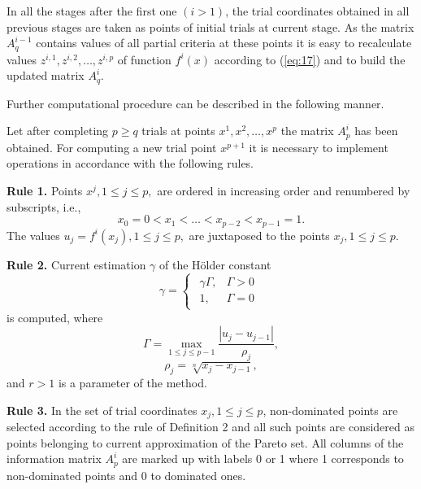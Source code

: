 \documentclass[runningheads]{llncs}
\begin{document}
In all the stages after the first one $(i>1)$, the trial coordinates obtained in all previous stages are taken as points of initial trials at current stage. As the matrix $A^{i-1}_q$ contains values of all partial criteria at these points it is easy to recalculate values $z^{i,1}, z^{i,2}, \dots, z^{i,p}$ of function $f^i(x)$ according to (\ref{eq:17}) and to build the updated matrix $A^i_q$.

Further computational procedure can be described in the following manner.

Let after completing $p \geq q$ trials at points $x^1, x^2, \dots, x^p$ the matrix $A^i_p$ has been obtained. For computing a new trial point $x^{p+1}$ it is necessary to implement operations in accordance with the following rules.

\textbf{Rule 1.} Points $x^j, 1 \leq j\leq p,$ are ordered in increasing order and renumbered by subscripts, i.e.,
\begin{equation}
    \label{eq:19}
    x_0 = 0 < x_1 < \dots < x_{p-2} < x_{p-1} = 1.
\end{equation}
The values $u_j = f^i(x_j), 1\leq j \leq p,$ are juxtaposed to the points $x_j, 1\leq j \leq p$.

\textbf{Rule 2.} Current estimation $\gamma$ of the H{\" o}lder constant  
\begin{equation}
    \label{eq:20}
\gamma=
\begin{cases}
  \begin{matrix}
     \gamma \Gamma, & \Gamma >0 \\
     1, & \Gamma = 0 
  \end{matrix}
\end{cases}
\end{equation}
is computed, where
\begin{equation}
    \label{eq:21}
\Gamma=
\max_{1 \leq j \leq p-1} {\frac{|u_j - u_{j-1}|}{\rho_j} },
\end{equation}
\begin{equation}
    \label{eq:22}
\rho_j = \sqrt[n]{x_j-x_{j-1}},
\end{equation}
and $r>1$ is a parameter of the method.

\textbf{Rule 3.} In the set of trial coordinates $x_j, 1 \leq j \leq p$, non-dominated points are selected according to the rule of Definition 2 and all such points are considered as points belonging to current approximation of the Pareto set. All columns of the information matrix $A^i_p$ are marked up with labels 0 or 1 where 1 corresponds to non-dominated points and 0 to dominated ones.
\end{document}
